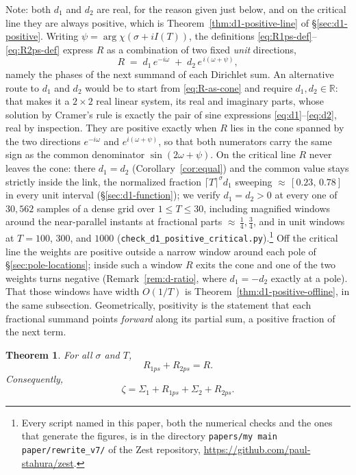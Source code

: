 \documentclass[11pt]{article}
\newtheorem{theorem}{Theorem}[section]
\theoremstyle{definition}
\begin{document}
Note: both $d_1$ and $d_2$ are real, for the reason given just below, and on
the critical line they are always positive, which is
Theorem~\ref{thm:d1-positive-line} of \S\ref{sec:d1-positive}.
Writing $\psi=\arg\chi(\sigma+iI(T))$, the
definitions \eqref{eq:R1ps-def}--\eqref{eq:R2ps-def} express $R$ as a combination
of two fixed \emph{unit} directions,
\begin{equation}\label{eq:R-as-cone}
R \;=\; d_1\,e^{-i\omega} \;+\; d_2\,e^{\,i(\omega+\psi)},
\end{equation}
namely the phases of the next summand of each Dirichlet sum. An alternative
route to $d_1$ and $d_2$ would be to start from \eqref{eq:R-as-cone} and
require $d_1,d_2\in\mathbb{R}$: that makes it a $2\times2$ real linear system,
its real and imaginary parts, whose solution by Cramer's rule is exactly the
pair of sine expressions \eqref{eq:d1}--\eqref{eq:d2}, real by inspection.
They are positive exactly when $R$ lies in the cone spanned by the two
directions $e^{-i\omega}$ and $e^{i(\omega+\psi)}$, so that both numerators carry the
same sign as the common denominator $\sin(2\omega+\psi)$. On the critical line
$R$ never leaves the cone: there $d_1=d_2$ (Corollary~\ref{cor:equal}) and the
common value stays strictly inside the link, the normalized fraction
$\lceil T\rceil^{\sigma}d_1$ sweeping ${\approx}\,[0.23,\,0.78]$ in every unit
interval (\S\ref{sec:d1-function}); we verify $d_1=d_2>0$ at every one of
$30{,}562$ samples of a dense grid over $1\le T\le30$, including magnified
windows around the near-parallel instants at fractional parts
${\approx}\,\tfrac14,\tfrac34$, and in unit windows at $T=100$, $300$, and
$1000$ (\texttt{check\_d1\_positive\_critical.py}).\footnote{Every script named
in this paper, both the numerical checks and the ones that generate the
figures, is in the directory \texttt{papers/my main paper/rewrite\_v7/} of the
Zest repository, \url{https://github.com/paul-stahura/zest}.} Off the critical line the
weights are positive outside a narrow window around each pole of
\S\ref{sec:pole-locations}; inside such a window $R$ exits the cone and one of
the two weights turns negative (Remark~\ref{rem:d-ratio}, where $d_1=-d_2$
exactly at a pole). That those windows have width $O(1/T)$ is
Theorem~\ref{thm:d1-positive-offline}, in the same
subsection. Geometrically, positivity is the statement that each
fractional summand points \emph{forward} along its
partial sum, a positive fraction of the next term.

\begin{theorem}\label{thm:decomp}
For all $\sigma$ and $T$,
\[
R_{1ps} + R_{2ps} = R.
\]
Consequently,
\[
\zeta = \Sigma_{1} + R_{1ps} + \Sigma_{2} + R_{2ps}.
\]
\end{theorem}
\end{document}
